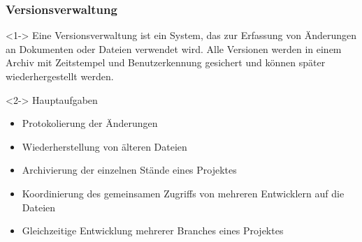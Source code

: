 \begin{frame}
	\frametitle{Versionsverwaltung}
	\begin{definition} <1->
		Eine Versionsverwaltung ist ein System, das zur Erfassung von Änderungen an Dokumenten oder Dateien verwendet wird. Alle Versionen werden in einem Archiv mit Zeitstempel und Benutzerkennung gesichert und können später wiederhergestellt werden.
	\end{definition}
	\begin{block} <2-> {Hauptaufgaben}
		\begin{itemize}
			\item <2-> Protokolierung der Änderungen
			\item <3-> Wiederherstellung von älteren Dateien
			\item <4-> Archivierung der einzelnen Stände eines Projektes
			\item <5-> Koordinierung des gemeinsamen Zugriffs von mehreren Entwicklern auf die Dateien
			\item <6-> Gleichzeitige Entwicklung mehrerer Branches eines Projektes
		\end{itemize}
	\end{block}	
\end{frame}

